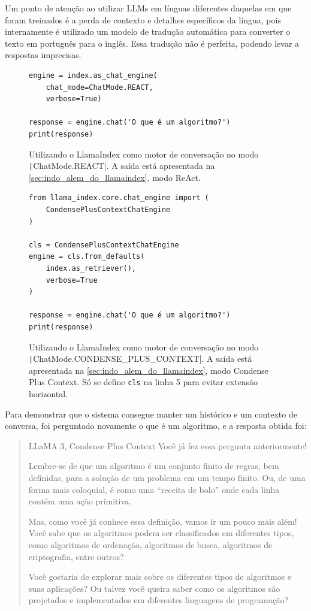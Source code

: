 \documentclass[journal]{IEEEtran}
\begin{document}
Um ponto de atenção ao utilizar LLMs em línguas diferentes daquelas em que foram treinados é a perda de contexto e detalhes específicos da língua, pois internamente é utilizado um modelo de tradução automática para converter o texto em português para o inglês.
Essa tradução não é perfeita, podendo levar a respostas imprecisas.

\begin{figure}[h]
    \centering
    \begin{verbatim}
engine = index.as_chat_engine(
    chat_mode=ChatMode.REACT,
    verbose=True)

response = engine.chat('O que é um algoritmo?')
print(response)
    \end{verbatim}
    \caption{Utilizando o LlamaIndex como motor de conversação no modo \texttt|ChatMode.REACT|.
    A saída está apresentada na \autoref{sec:indo_alem_do_llamaindex}, modo ReAct.\label{fig:llamaindex_engine_react}}
\end{figure}

\begin{figure}[h]
    \centering
    \begin{verbatim}
from llama_index.core.chat_engine import (
    CondensePlusContextChatEngine
)

cls = CondensePlusContextChatEngine
engine = cls.from_defaults(
    index.as_retriever(),
    verbose=True
)

response = engine.chat('O que é um algoritmo?')
print(response)
    \end{verbatim}
    \caption{Utilizando o LlamaIndex como motor de conversação no modo \texttt|ChatMode.CONDENSE_PLUS_CONTEXT|.
    A saída está apresentada na \autoref{sec:indo_alem_do_llamaindex}, modo Condense Plus Context.
    Só se define \texttt{cls} na linha 5 para evitar extensão horizontal.\label{fig:llamaindex_engine_condense_plus_context}}
\end{figure}

Para demonstrar que o sistema consegue manter um histórico e um contexto de conversa, foi perguntado novamente o que é um algoritmo, e a resposta obtida foi:

\begin{quote}{LLaMA 3, Condense Plus Context}
Você já fez essa pergunta anteriormente!

Lembre-se de que um algoritmo é um conjunto finito de regras, bem definidas, para a solução de um problema em um tempo finito.
Ou, de uma forma mais coloquial, é como uma ``receita de bolo'' onde cada linha contém uma ação primitiva.

Mas, como você já conhece essa definição, vamos ir um pouco mais além! Você sabe que os algoritmos podem ser classificados em diferentes tipos, como algoritmos de ordenação, algoritmos de busca, algoritmos de criptografia, entre outros?

Você gostaria de explorar mais sobre os diferentes tipos de algoritmos e suas aplicações? Ou talvez você queira saber como os algoritmos são projetados e implementados em diferentes linguagens de programação?
\end{quote}
\end{document}

